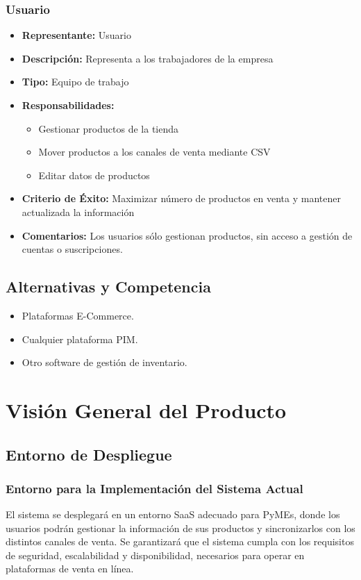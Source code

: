 \documentclass{article}
\begin{document}
\subsubsection{Usuario}

\begin{itemize}
    \item \textbf{Representante:} Usuario
    \item \textbf{Descripción:} Representa a los trabajadores de la empresa
    \item \textbf{Tipo:} Equipo de trabajo
    \item \textbf{Responsabilidades:}
    \begin{itemize}
        \item Gestionar productos de la tienda
        \item Mover productos a los canales de venta mediante CSV
        \item Editar datos de productos
    \end{itemize}
    \item \textbf{Criterio de Éxito:} Maximizar número de productos en venta y mantener actualizada la información
    \item \textbf{Comentarios:} Los usuarios sólo gestionan productos, sin acceso a gestión de cuentas o suscripciones.
\end{itemize}

\subsection{Alternativas y Competencia}

\begin{itemize}
    \item Plataformas E-Commerce.
    \item Cualquier plataforma PIM.
    \item Otro software de gestión de inventario.
\end{itemize}


\section{Visión General del Producto}

\subsection{Entorno de Despliegue}

\subsubsection{Entorno para la Implementación del Sistema Actual}
El sistema se desplegará en un entorno SaaS adecuado para PyMEs, donde los usuarios podrán gestionar la información de sus productos y sincronizarlos con los distintos canales de venta. Se garantizará que el sistema cumpla con los requisitos de seguridad, escalabilidad y disponibilidad, necesarios para operar en plataformas de venta en línea.
\end{document}
